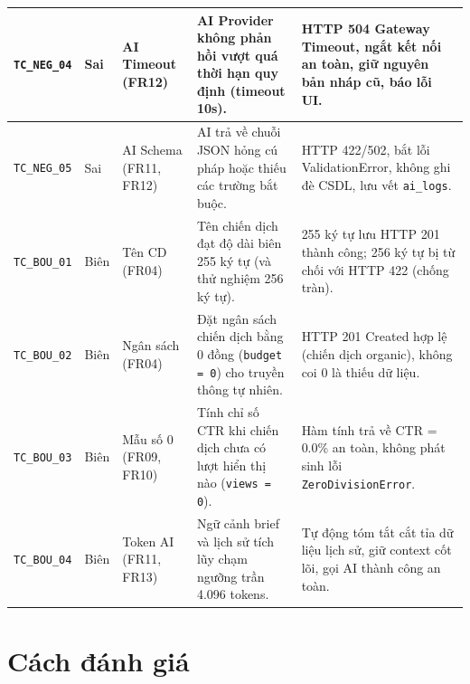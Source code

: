\begin{table}[H]
\begin{tabularx}{\textwidth}{|C{1.6cm}|C{1.1cm}|L{2.0cm}|Y|Y|}
\texttt{TC\_NEG\_04} & Sai & AI Timeout (FR12) & AI Provider không phản hồi vượt quá thời hạn quy định (timeout 10s). & HTTP 504 Gateway Timeout, ngắt kết nối an toàn, giữ nguyên bản nháp cũ, báo lỗi UI.\\
\hline
\texttt{TC\_NEG\_05} & Sai & AI Schema (FR11, FR12) & AI trả về chuỗi JSON hỏng cú pháp hoặc thiếu các trường bắt buộc. & HTTP 422/502, bắt lỗi ValidationError, không ghi đè CSDL, lưu vết \texttt{ai\_logs}.\\
\hline
\texttt{TC\_BOU\_01} & Biên & Tên CD (FR04) & Tên chiến dịch đạt độ dài biên 255 ký tự (và thử nghiệm 256 ký tự). & 255 ký tự lưu HTTP 201 thành công; 256 ký tự bị từ chối với HTTP 422 (chống tràn).\\
\hline
\texttt{TC\_BOU\_02} & Biên & Ngân sách (FR04) & Đặt ngân sách chiến dịch bằng 0 đồng (\texttt{budget = 0}) cho truyền thông tự nhiên. & HTTP 201 Created hợp lệ (chiến dịch organic), không coi 0 là thiếu dữ liệu.\\
\hline
\texttt{TC\_BOU\_03} & Biên & Mẫu số 0 (FR09, FR10) & Tính chỉ số CTR khi chiến dịch chưa có lượt hiển thị nào (\texttt{views = 0}). & Hàm tính trả về CTR = 0.0\% an toàn, không phát sinh lỗi \texttt{ZeroDivisionError}.\\
\hline
\texttt{TC\_BOU\_04} & Biên & Token AI (FR11, FR13) & Ngữ cảnh brief và lịch sử tích lũy chạm ngưỡng trần 4.096 tokens. & Tự động tóm tắt cắt tỉa dữ liệu lịch sử, giữ context cốt lõi, gọi AI thành công an toàn.\\
\hline
\end{tabularx}
\end{table}

\clearpage

\section{Cách đánh giá}\label{sec:v8-evaluation}


